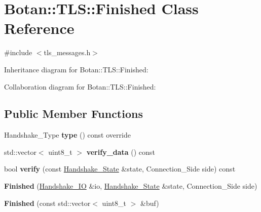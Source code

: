 \hypertarget{class_botan_1_1_t_l_s_1_1_finished}{}\section{Botan\+:\+:T\+LS\+:\+:Finished Class Reference}
\label{class_botan_1_1_t_l_s_1_1_finished}


{\ttfamily \#include $<$tls\+\_\+messages.\+h$>$}



Inheritance diagram for Botan\+:\+:T\+LS\+:\+:Finished\+:


Collaboration diagram for Botan\+:\+:T\+LS\+:\+:Finished\+:
\subsection*{Public Member Functions}
\begin{DoxyCompactItemize}
\item 
\mbox{\label{class_botan_1_1_t_l_s_1_1_finished_adf6906f27fa375ff6150aee8aa03422d}} 
Handshake\+\_\+\+Type {\bfseries type} () const override
\item 
\mbox{\label{class_botan_1_1_t_l_s_1_1_finished_a9f60def2faeaa788b8acb78d74f5b514}} 
std\+::vector$<$ uint8\+\_\+t $>$ {\bfseries verify\+\_\+data} () const
\item 
\mbox{\label{class_botan_1_1_t_l_s_1_1_finished_ad6ad321d710025bf3a40a23c4e39d9fa}} 
bool {\bfseries verify} (const \mbox{\hyperlink{class_botan_1_1_t_l_s_1_1_handshake___state}{Handshake\+\_\+\+State}} \&state, Connection\+\_\+\+Side side) const
\item 
\mbox{\label{class_botan_1_1_t_l_s_1_1_finished_a67768b72c401ce603187a43075809fa5}} 
{\bfseries Finished} (\mbox{\hyperlink{class_botan_1_1_t_l_s_1_1_handshake___i_o}{Handshake\+\_\+\+IO}} \&io, \mbox{\hyperlink{class_botan_1_1_t_l_s_1_1_handshake___state}{Handshake\+\_\+\+State}} \&state, Connection\+\_\+\+Side side)
\item 
\mbox{\label{class_botan_1_1_t_l_s_1_1_finished_a645619c4833b04258c892fabc63fedb3}} 
{\bfseries Finished} (const std\+::vector$<$ uint8\+\_\+t $>$ \&buf)
\end{DoxyCompactItemize}


